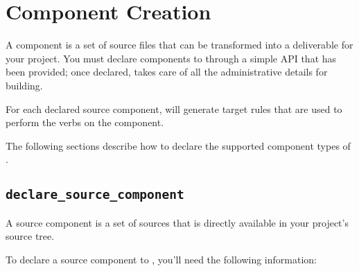 \section{Component Creation}\label{wrap:component-creation}
\label{wrap:source-components}

A component is a set of source files that can be transformed into a
deliverable for your project.  You must declare components to \lmsbw
through a simple API that has been provided; once declared, \lmsbw
takes care of all the administrative details for building.

For each declared source component, \lmsbw will generate target
\makefile rules that are used to perform the \lmsbw verbs on the component.

The following sections describe how to declare the supported
component types of \lmsbw.

\subsection{\texttt{declare\_source\_component}}

A source component is a set of sources that is directly available in
your project's source tree.

To declare a source component to \lmsbw, you'll need the following
information:

